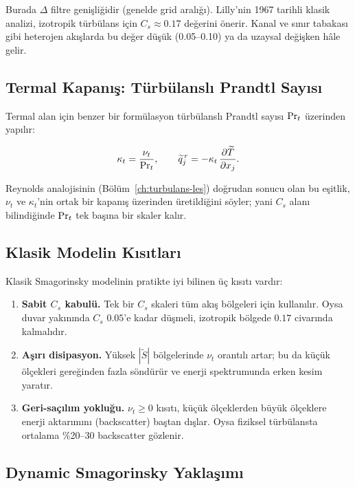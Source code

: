 Burada $\Delta$ filtre genişliğidir (genelde grid aralığı). Lilly'nin
1967 tarihli klasik analizi, izotropik türbülans için $C_s\approx 0.17$
değerini önerir. Kanal ve sınır tabakası gibi heterojen akışlarda bu
değer düşük (0.05--0.10) ya da uzaysal değişken hâle gelir.

\subsection{Termal Kapanış: Türbülanslı Prandtl Sayısı}

Termal alan için benzer bir formülasyon türbülanslı Prandtl sayısı
$\mathrm{Pr}_t$ üzerinden yapılır:

\begin{equation}
  \kappa_t = \frac{\nu_t}{\mathrm{Pr}_t},
  \qquad
  \widetilde{q}_j^{\,r} = -\kappa_t\,\frac{\partial \widetilde{T}}{\partial x_j}.
  \label{eq:thermal-closure}
\end{equation}

Reynolds analojisinin (Bölüm~\ref{ch:turbulans-les}) doğrudan sonucu
olan bu eşitlik, $\nu_t$ ve $\kappa_t$'nin ortak bir kapanış üzerinden
üretildiğini söyler; yani $C_s$ alanı bilindiğinde $\mathrm{Pr}_t$ tek başına
bir skaler kalır.

\subsection{Klasik Modelin Kısıtları}

Klasik Smagorinsky modelinin pratikte iyi bilinen üç kısıtı vardır:

\begin{enumerate}
  \item \textbf{Sabit $C_s$ kabulü.} Tek bir $C_s$ skaleri tüm akış
        bölgeleri için kullanılır. Oysa duvar yakınında $C_s$
        $0.05$'e kadar düşmeli, izotropik bölgede $0.17$ civarında
        kalmalıdır.
  \item \textbf{Aşırı disipasyon.} Yüksek $|\widetilde{S}|$ bölgelerinde
        $\nu_t$ orantılı artar; bu da küçük ölçekleri gereğinden fazla
        söndürür ve enerji spektrumunda erken kesim yaratır.
  \item \textbf{Geri-saçılım yokluğu.} $\nu_t \geq 0$ kısıtı, küçük
        ölçeklerden büyük ölçeklere enerji aktarımını (backscatter)
        baştan dışlar. Oysa fiziksel türbülansta ortalama \%20--30 backscatter
        gözlenir.
\end{enumerate}

\subsection{Dynamic Smagorinsky Yaklaşımı}

